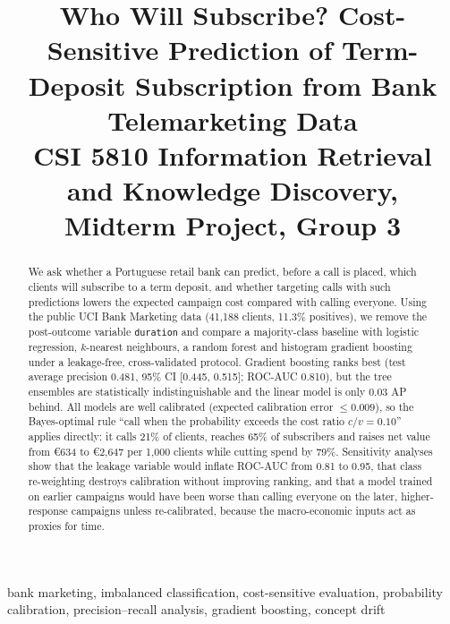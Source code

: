\documentclass[conference]{IEEEtran}
\begin{document}
\title{Who Will Subscribe? Cost-Sensitive Prediction of Term-Deposit Subscription from Bank Telemarketing Data\\
{\large CSI 5810 Information Retrieval and Knowledge Discovery, Midterm Project, Group 3}}



\maketitle

\begin{abstract}
We ask whether a Portuguese retail bank can predict, before a call is placed, which clients will subscribe to a term deposit, and whether targeting calls with such predictions lowers the expected campaign cost compared with calling everyone. Using the public UCI Bank Marketing data (41,188 clients, 11.3\% positives), we remove the post-outcome variable \texttt{duration} and compare a majority-class baseline with logistic regression, $k$-nearest neighbours, a random forest and histogram gradient boosting under a leakage-free, cross-validated protocol. Gradient boosting ranks best (test average precision 0.481, 95\% CI [0.445, 0.515]; ROC-AUC 0.810), but the tree ensembles are statistically indistinguishable and the linear model is only 0.03 AP behind. All models are well calibrated (expected calibration error $\le0.009$), so the Bayes-optimal rule ``call when the probability exceeds the cost ratio $c/v=0.10$'' applies directly: it calls 21\% of clients, reaches 65\% of subscribers and raises net value from \euro634 to \euro2,647 per 1,000 clients while cutting spend by 79\%. Sensitivity analyses show that the leakage variable would inflate ROC-AUC from 0.81 to 0.95, that class re-weighting destroys calibration without improving ranking, and that a model trained on earlier campaigns would have been worse than calling everyone on the later, higher-response campaigns unless re-calibrated, because the macro-economic inputs act as proxies for time.
\end{abstract}

\begin{IEEEkeywords}
bank marketing, imbalanced classification, cost-sensitive evaluation, probability calibration, precision--recall analysis, gradient boosting, concept drift
\end{IEEEkeywords}
\end{document}

